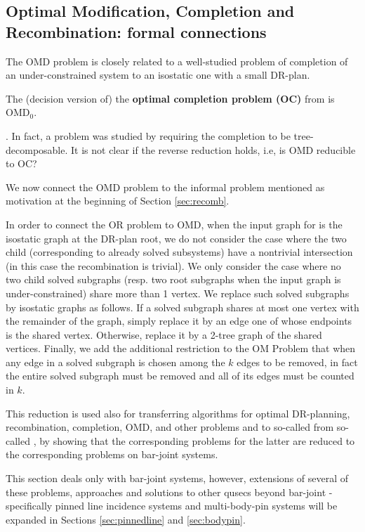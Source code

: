 \subsection{Optimal Modification, Completion and Recombination: formal
connections}
%
The OMD problem is closely related to a well-studied problem of
completion of an under-constrained system to an isostatic one with a
small DR-plan.
\begin{observation}
    The (decision version of) the {\bf optimal completion problem
    (OC)} from \cite{bib:survey, j-a, fang} is OMD$_0$.
\end{observation}.
In fact, a  problem was studied by \cite{j-a}
requiring the completion to be tree-decomposable. It is not clear if
the reverse reduction holds, i.e, is OMD reducible to OC?

We now connect the OMD problem to the informal  problem mentioned as motivation at the beginning
of Section \ref{sec:recomb}.

In order to connect the OR problem to OMD, when the input graph for is
the isostatic graph at the DR-plan root, we do not consider the case
where the two child  (corresponding to already
solved subsystems) have a nontrivial intersection (in this case the
recombination is trivial). We only consider the case where no two
child solved subgraphs (resp. two root subgraphs when the input graph
is under-constrained) share more than 1 vertex. We replace such solved
subgraphs  by isostatic graphs as follows. If a solved subgraph shares
at most one vertex with the remainder of the graph, simply replace it
by an edge one of whose endpoints  is the shared vertex. Otherwise,
replace it by  a 2-tree graph of the shared vertices. Finally, we add
the additional restriction to the OM Problem that when any edge in a
solved subgraph is chosen among the $k$ edges to be removed, in fact
the entire solved subgraph must be removed  and all of its edges must
be counted in $k$.

This reduction is used also for transferring  algorithms for optimal
DR-planning, recombination, completion, OMD, and other problems and to
so-called  from so-called ,
by showing that the corresponding problems for the latter are reduced
to the corresponding problems on bar-joint systems.

\note This section deals only with bar-joint systems, however,
extensions of several of these problems, approaches and solutions to
other qusecs beyond  bar-joint - specifically pinned line incidence
systems and multi-body-pin systems will be expanded in Sections
\ref{sec:pinnedline} and \ref{sec:bodypin}.

